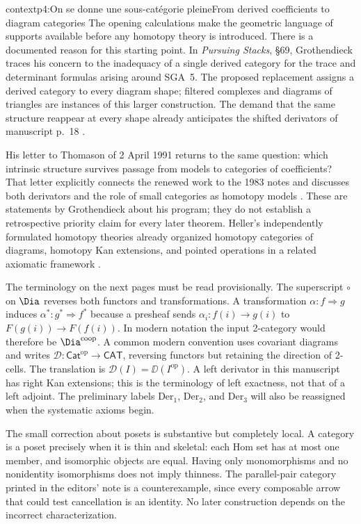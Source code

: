 \begin{dcomment}{context}{p4:On se donne une sous-catégorie pleine}{From derived coefficients to diagram categories}
The opening calculations make the geometric language of supports available before any homotopy theory is introduced. There is a documented reason for this starting point. In \emph{Pursuing Stacks}, \S69, Grothendieck traces his concern to the inadequacy of a single derived category for the trace and determinant formulas arising around SGA~5. The proposed replacement assigns a derived category to every diagram shape; filtered complexes and diagrams of triangles are instances of this larger construction. The demand that the same structure reappear at every shape already anticipates the shifted derivators of manuscript p.~18 \citep[\S69, pp.~1--3 of the edited extract]{Grothendieck1983}.

His letter to Thomason of 2 April 1991 returns to the same question: which intrinsic structure survives passage from models to categories of coefficients? That letter explicitly connects the renewed work to the 1983 notes and discusses both derivators and the role of small categories as homotopy models \citep[pp.~2--4 of the edited letter]{Grothendieck1991Letter}. These are statements by Grothendieck about his program; they do not establish a retrospective priority claim for every later theorem. Heller's independently formulated homotopy theories already organized homotopy categories of diagrams, homotopy Kan extensions, and pointed operations in a related axiomatic framework \citep[Chs.~II--III]{Heller1988}.

The terminology on the next pages must be read provisionally. The superscript $\circ$ on $\Dia$ reverses both functors and transformations. A transformation $\alpha:f\Rightarrow g$ induces $\alpha^*:g^*\Rightarrow f^*$ because a presheaf sends $\alpha_i:f(i)\to g(i)$ to $F(g(i))\to F(f(i))$. In modern notation the input 2-category would therefore be $\Dia^{\mathrm{coop}}$. A common modern convention uses covariant diagrams and writes $\mathscr D:\mathsf{Cat}^{\mathrm{op}}\to\mathsf{CAT}$, reversing functors but retaining the direction of 2-cells. The translation is $\mathscr D(I)=\DD(I^{\mathrm{op}})$. A left derivator in this manuscript has right Kan extensions; this is the terminology of left exactness, not that of a left adjoint. The preliminary labels $\mathrm{Der}_1$, $\mathrm{Der}_2$, and $\mathrm{Der}_3$ will also be reassigned when the systematic axioms begin.

The small correction about posets is substantive but completely local. A category is a poset precisely when it is thin and skeletal: each Hom set has at most one member, and isomorphic objects are equal. Having only monomorphisms and no nonidentity isomorphisms does not imply thinness. The parallel-pair category printed in the editors' note is a counterexample, since every composable arrow that could test cancellation is an identity. No later construction depends on the incorrect characterization.
\end{dcomment}

